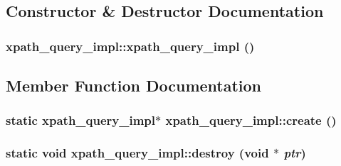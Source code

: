 \subsection{Constructor \& Destructor Documentation}
\hypertarget{structxpath__query__impl_a57ef8fcfa3f46e6c395edb00328e9a0e}{
\subsubsection[{xpath\_\-query\_\-impl}]{\setlength{\rightskip}{0pt plus 5cm}xpath\_\-query\_\-impl::xpath\_\-query\_\-impl ()}}
\label{structxpath__query__impl_a57ef8fcfa3f46e6c395edb00328e9a0e}


\subsection{Member Function Documentation}
\hypertarget{structxpath__query__impl_afcf45bb9a20a4117b1e963d83277aa7f}{
\subsubsection[{create}]{\setlength{\rightskip}{0pt plus 5cm}static {\bf xpath\_\-query\_\-impl}$\ast$ xpath\_\-query\_\-impl::create ()}}
\label{structxpath__query__impl_afcf45bb9a20a4117b1e963d83277aa7f}
\hypertarget{structxpath__query__impl_a9b7194b1356cca3f3b62f4cdb8d8960f}{
\subsubsection[{destroy}]{\setlength{\rightskip}{0pt plus 5cm}static void xpath\_\-query\_\-impl::destroy (void $\ast$ {\em ptr})}}
\label{structxpath__query__impl_a9b7194b1356cca3f3b62f4cdb8d8960f}


